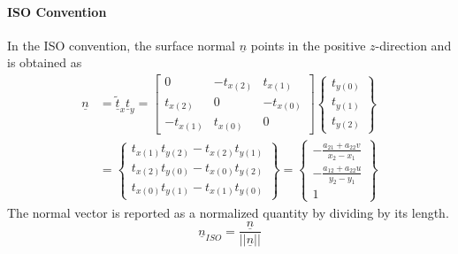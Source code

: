\documentclass[
10pt, %
a4paper, %
oneside, %
headinclude,footinclude, %
BCOR5mm, %
]{scrartcl}
\begin{document}
\paragraph{ISO Convention}
In the ISO convention, the surface normal $\underline{n}$ points in the positive $z$-direction and is obtained as
\begin{equation}
  \begin{split}
  \underline{n} &= \underline{\tilde{t}}_x \underline{t}_y = \begin{bmatrix}
    0        & -t_{x(2)} & t_{x(1)}\\
    t_{x(2)} & 0         & -t_{x(0)}\\
    -t_{x(1)} & t_{x(0)} & 0
 \end{bmatrix}
 \begin{Bmatrix} t_{y(0)} \\ t_{y(1)} \\ t_{y(2)}  \end{Bmatrix}\\
  &= \begin{Bmatrix}
  t_{x(1)}t_{y(2)} - t_{x(2)} t_{y(1)} \\
  t_{x(2)}t_{y(0)} - t_{x(0)} t_{y(2)} \\
  t_{x(0)}t_{y(1)} - t_{x(1)} t_{y(0)}
  \end{Bmatrix} =
  \begin{Bmatrix}
     - \frac{a_{21} + a_{22}v}{x_2 - x_1} \\
     - \frac{a_{12} + a_{22}u}{y_2 - y_1} \\
    1
  \end{Bmatrix}
\end{split}
\end{equation}
The normal vector is reported as a normalized quantity by dividing by its length.
\begin{equation}
  \underline{n}_{ISO} = \frac{\underline{n}}{\lvert \lvert{\underline{n}}\rvert \rvert}
\end{equation}
\end{document}
